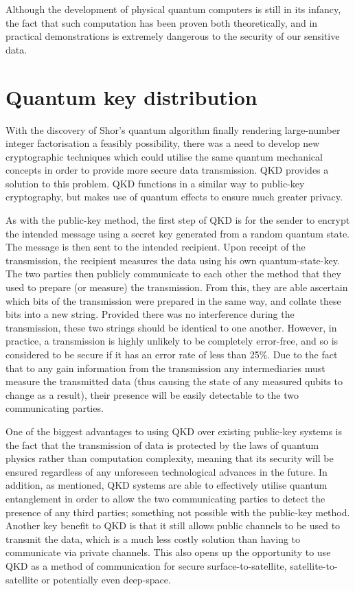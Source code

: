 \documentclass[runningheads,a4paper]{llncs}
\begin{document}
Although the development of physical quantum computers is still in its infancy, the fact that such computation has been proven both theoretically, and in practical demonstrations is extremely dangerous to the security of our sensitive data.

\section{Quantum key distribution}

With the discovery of Shor's quantum algorithm finally rendering large-number integer factorisation a feasibly possibility, there was a need to develop new cryptographic techniques which could utilise the same quantum mechanical concepts in order to provide more secure data transmission. QKD provides a solution to this problem. QKD functions in a similar way to public-key cryptography, but makes use of quantum effects to ensure much greater privacy.

As with the public-key method, the first step of QKD is for the sender to encrypt the intended message using a secret key generated from a random quantum state. The message is then sent to the intended recipient. Upon receipt of the transmission, the recipient measures the data using his own quantum-state-key. The two parties then publicly communicate to each other the method that they used to prepare (or measure) the transmission. From this, they are able ascertain which bits of the transmission were prepared in the same way, and collate these bits into a new string. Provided there was no interference during the transmission, these two strings should be identical to one another. However, in practice, a transmission is highly unlikely to be completely error-free, and so is considered to be secure if it has an error rate of less than 25\%\cite{Steane:1997zr}. Due to the fact that to any gain information from the transmission any intermediaries must measure the transmitted data (thus causing the state of any measured qubits to change as a result),  their presence will be easily detectable to the two communicating parties.

One of the biggest advantages to using QKD over existing public-key systems is the fact that the transmission of data is protected by the laws of quantum physics rather than computation complexity, meaning that its security will be ensured regardless of any unforeseen technological advances in the future. In addition, as mentioned, QKD systems are able to effectively utilise quantum entanglement in order to allow the two communicating parties to detect the presence of any third parties; something not possible with the public-key method. Another key benefit to QKD is that it still allows public channels to be used to transmit the data, which is a much less costly solution than having to communicate via private channels. This also opens up the opportunity to use QKD as a method of communication for secure surface-to-satellite, satellite-to-satellite or potentially even deep-space\cite{Hughes:2000uq}.
\end{document}
